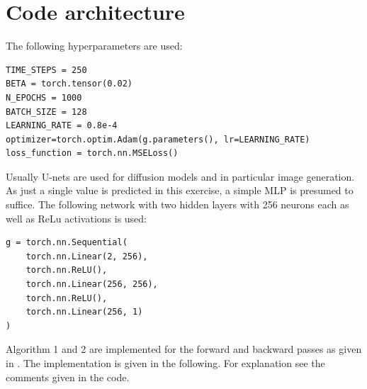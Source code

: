 \chapter{Code architecture}
The following hyperparameters are used:
\begin{verbatim}
TIME_STEPS = 250
BETA = torch.tensor(0.02)
N_EPOCHS = 1000
BATCH_SIZE = 128
LEARNING_RATE = 0.8e-4
optimizer=torch.optim.Adam(g.parameters(), lr=LEARNING_RATE)
loss_function = torch.nn.MSELoss()
\end{verbatim}
Usually U-nets are used for diffusion models and in particular image generation. As just a single value is predicted in this exercise, a simple MLP is presumed to suffice. 
The following network with two hidden layers with 256 neurons each as well as ReLu activations is used:
\begin{verbatim}
g = torch.nn.Sequential(
    torch.nn.Linear(2, 256), 
    torch.nn.ReLU(),
    torch.nn.Linear(256, 256),
    torch.nn.ReLU(),
    torch.nn.Linear(256, 1)
)
\end{verbatim}
Algorithm 1 and 2 are implemented for the forward and backward passes as given in \cite{paper}.
The implementation is given in the following. For explanation see the comments given in the code.

